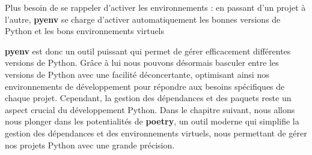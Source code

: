 Plus besoin de se rappeler d'activer les environnements : en passant d'un projet à l'autre, \textbf{pyenv} se charge d'activer automatiquement les bonnes versions de Python et les bons environnements virtuels
\bigskip

\begin{center}
\end{center}

\textbf{pyenv} est donc un outil puissant qui permet de gérer efficacement différentes versions de Python. Grâce à lui nous pouvons désormais basculer entre les versions de Python avec une facilité déconcertante, optimisant ainsi nos environnements de développement pour répondre aux besoins spécifiques de chaque projet. Cependant, la gestion des dépendances et des paquets reste un aspect crucial du développement Python. Dans le chapitre suivant, nous allons nous plonger dans les potentialités de \textbf{poetry}, un outil moderne qui simplifie la gestion des dépendances et des environnements virtuels, nous permettant de gérer nos projets Python avec une grande précision. 

